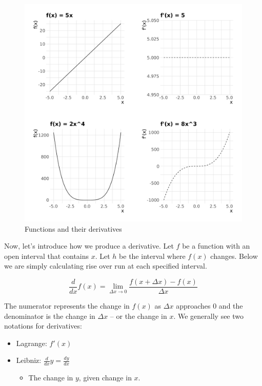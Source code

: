 \begin{figure}[ht]
    \centering
        \includegraphics[scale = 0.55]{figures/derivs.pdf}    
    \caption{Functions and their derivatives}
    \label{fig:deriv}
\end{figure}

\noindent Now, let's introduce how we produce a derivative. Let $f$ be a function with an open interval that contains $x$. Let $h$ be the interval where $f(x)$ changes. Below we are simply calculating rise over run at each specified interval.

\begin{equation*}
    \frac{d}{dx}f(x) = 
    \lim_{\Delta x \rightarrow 0} \frac{f(x + \Delta x) - f(x)}{\Delta x} 
\end{equation*}

\noindent The numerator represents the change in $f(x)$ as $\Delta x$ approaches 0 and the denominator is the change in $\Delta x$ -- or the change in $x$. We generally see two notations for derivatives:
\begin{itemize}
    \item Lagrange: $f'(x)$
    \item Leibniz: $\frac{d}{dx}y = \frac{dy}{dx}$
    \begin{itemize}
        \item The change in $y$, given change in $x$.
    \end{itemize}
\end{itemize}

